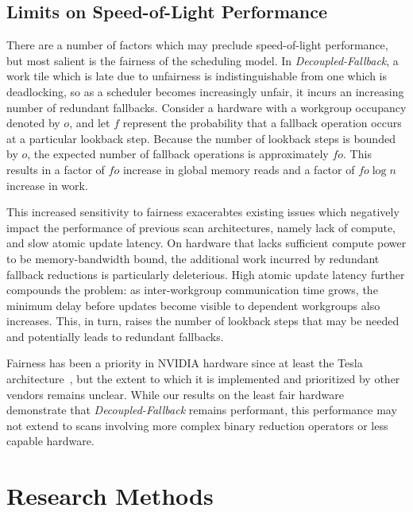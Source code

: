 \documentclass[sigconf]{acmart}
\begin{document}
\subsection{Limits on Speed-of-Light Performance}
There are a number of factors which may preclude speed-of-light performance, but most salient is the fairness of the scheduling model. In \emph{Decoupled-Fallback}, a work tile which is late due to unfairness is indistinguishable from one which is deadlocking, so as a scheduler becomes increasingly unfair, it incurs an increasing number of redundant fallbacks. Consider a hardware with a workgroup occupancy denoted by $o$, and let $f$ represent the probability that a fallback operation occurs at a particular lookback step. Because the number of lookback steps is bounded by $o$, the expected number of fallback operations is approximately $fo$. This results in a factor of $fo$ increase in global memory reads and a factor of $fo\log{n}$ increase in work.

This increased sensitivity to fairness exacerabtes existing issues which negatively impact the performance of previous scan architectures, namely lack of compute, and slow atomic update latency. On hardware that lacks sufficient compute power to be memory-bandwidth bound, the additional work incurred by redundant fallback reductions is particularly deleterious. High atomic update latency further compounds the problem: as inter-workgroup communication time grows, the minimum delay before updates become visible to dependent workgroups also increases. This, in turn, raises the number of lookback steps that may be needed and potentially leads to redundant fallbacks.

Fairness has been a priority in NVIDIA hardware since at least the Tesla architecture~\cite{}, but the extent to which it is implemented and prioritized by other vendors remains unclear. While our results on the least fair hardware demonstrate that \emph{Decoupled-Fallback} remains performant, this performance may not extend to scans involving more complex binary reduction operators or less capable hardware.
\begin{acks}
\end{acks}




\appendix

\section{Research Methods}
\end{document}
